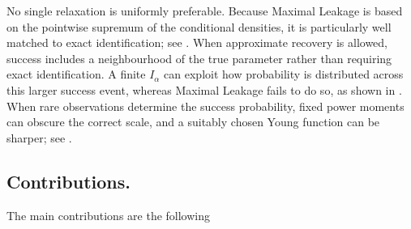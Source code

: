 \documentclass[11pt]{article}
\theoremstyle{definition}
\theoremstyle{remark}
\newcommand{\1}{\boldsymbol{1}}
\begin{document}
No single relaxation is uniformly preferable. Because Maximal Leakage is
based on the pointwise supremum of the conditional densities, it is
particularly well matched to exact identification; see
. When approximate recovery is allowed, success includes a neighbourhood of the
true parameter rather than requiring exact identification. A finite
\(I_\alpha\) can exploit how probability is distributed across this
larger success event, whereas Maximal Leakage fails to do so, as shown in
. When rare observations
determine the success probability, fixed power moments can obscure the
correct scale, and a suitably chosen Young function can be sharper; see
.

\subsection{Contributions.}
The main contributions are the following
\end{document}
